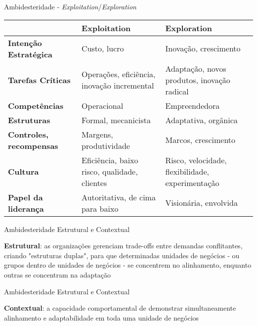 \begin{frame}{Ambidesteridade - \textit{Exploitation}/\textit{Exploration}}
	\begin{table}[]
	{\small
	\centering
	\begin{tabularx}{\textwidth}{|l|X|X|}
	\hline
	                                & \textbf{Exploitation}                        & \textbf{Exploration}                             \\ \hline
	\textbf{Intenção Estratégica}   & Custo, lucro                                 & Inovação, crescimento                            \\ \hline
	\textbf{Tarefas Críticas}       & Operações, eficiência, inovação incremental  & Adaptação, novos produtos, inovação radical      \\ \hline
	\textbf{Competências}           & Operacional                                  & Empreendedora                                    \\ \hline
	\textbf{Estruturas}             & Formal, mecanicista                          & Adaptativa, orgânica                             \\ \hline
	\textbf{Controles, recompensas} & Margens, produtividade                       & Marcos, crescimento                              \\ \hline
	\textbf{Cultura}                & Eficiência, baixo risco, qualidade, clientes & Risco, velocidade, flexibilidade, experimentação \\ \hline
	\textbf{Papel da liderança}     & Autoritativa, de cima para baixo             & Visionária, envolvida                            \\ \hline
	\end{tabularx}}%
	\end{table}	
\end{frame}

\begin{frame}{Ambidesteridade Estrutural e Contextual}
    \begin{vfilleditems}
    \item \textbf{Estrutural}: as organizações gerenciam trade-offs
	    entre demandas conflitantes, criando "estruturas duplas",
	    para que determinadas unidades de negócios - ou
	    grupos dentro de unidades de negócios - se concentrem no
	    alinhamento, enquanto outras se concentram na adaptação
    \end{vfilleditems}
\end{frame}

\begin{frame}{Ambidesteridade Estrutural e Contextual}
    \begin{vfilleditems}
    \item \textbf{Contextual}: a capacidade comportamental de demonstrar
	    simultaneamente alinhamento e adaptabilidade em
	    toda uma unidade de negócios
    \end{vfilleditems}
\end{frame}

